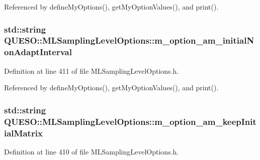 Referenced by define\-My\-Options(), get\-My\-Option\-Values(), and print().

\hypertarget{class_q_u_e_s_o_1_1_m_l_sampling_level_options_a93c77cdea4092dc471e405270c5b226f}{
\subsubsection[{m\-\_\-option\-\_\-am\-\_\-initial\-Non\-Adapt\-Interval}]{\setlength{\rightskip}{0pt plus 5cm}std\-::string Q\-U\-E\-S\-O\-::\-M\-L\-Sampling\-Level\-Options\-::m\-\_\-option\-\_\-am\-\_\-initial\-Non\-Adapt\-Interval\hspace{0.3cm}{\ttfamily [private]}}}\label{class_q_u_e_s_o_1_1_m_l_sampling_level_options_a93c77cdea4092dc471e405270c5b226f}


Definition at line 411 of file M\-L\-Sampling\-Level\-Options.\-h.



Referenced by define\-My\-Options(), get\-My\-Option\-Values(), and print().

\hypertarget{class_q_u_e_s_o_1_1_m_l_sampling_level_options_a03b9660a262500e674dcc2afa77af169}{
\subsubsection[{m\-\_\-option\-\_\-am\-\_\-keep\-Initial\-Matrix}]{\setlength{\rightskip}{0pt plus 5cm}std\-::string Q\-U\-E\-S\-O\-::\-M\-L\-Sampling\-Level\-Options\-::m\-\_\-option\-\_\-am\-\_\-keep\-Initial\-Matrix\hspace{0.3cm}{\ttfamily [private]}}}\label{class_q_u_e_s_o_1_1_m_l_sampling_level_options_a03b9660a262500e674dcc2afa77af169}


Definition at line 410 of file M\-L\-Sampling\-Level\-Options.\-h.



